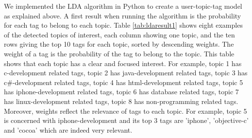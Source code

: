 We implemented the LDA algorithm in Python to create a user-topic-tag model as explained above.
A first result when running the algorithm is the probability for each tag to belong to each topic. 
Table \ref{tab:ldaresult1} shows eight examples of the detected topics of interest, each column showing one topic, and the ten rows giving the top 10 tags for each topic, sorted by descending weights. The weight of a tag is the probability of the tag to belong to the topic.  
This table shows that each topic has a clear and focused interest. For example, topic 1 has c-development related tags, topic 2 has java-development related tags, topic 3 has c\#-development related tags, topic 4 has html-development related tags, topic 5 has iphone-development related tags, topic 6 has database related tags, topic 7 has linux-development related tags, topic 8 has non-programming related tags. 
Moreover, weights reflect the relevance of tags to each topic. For example, topic 5 is concerned with iphone-development and its top 3 tags are 'iphone', 'objective-c' and 'cocoa' which are indeed very relevant.

